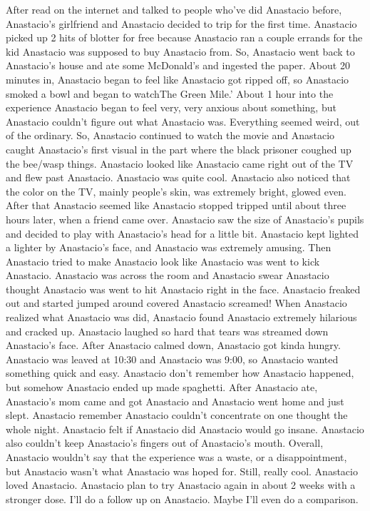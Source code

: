 \documentclass[12pt]{book}
\begin{document}
After read on the internet and talked to people who've did Anastacio before, Anastacio's girlfriend and Anastacio decided to trip for the first time. Anastacio picked up 2 hits of blotter for free because Anastacio ran a couple errands for the kid Anastacio was supposed to buy Anastacio from. So, Anastacio went back to Anastacio's house and ate some McDonald's and ingested the paper. About 20 minutes in, Anastacio began to feel like Anastacio got ripped off, so Anastacio smoked a bowl and began to watchThe Green Mile.' About 1 hour into the experience Anastacio began to feel very, very anxious about something, but Anastacio couldn't figure out what Anastacio was. Everything seemed weird, out of the ordinary. So, Anastacio continued to watch the movie and Anastacio caught Anastacio's first visual in the part where the black prisoner coughed up the bee/wasp things. Anastacio looked like Anastacio came right out of the TV and flew past Anastacio. Anastacio was quite cool. Anastacio also noticed that the color on the TV, mainly people's skin, was extremely bright, glowed even. After that Anastacio seemed like Anastacio stopped tripped until about three hours later, when a friend came over. Anastacio saw the size of Anastacio's pupils and decided to play with Anastacio's head for a little bit. Anastacio kept lighted a lighter by Anastacio's face, and Anastacio was extremely amusing. Then Anastacio tried to make Anastacio look like Anastacio was went to kick Anastacio. Anastacio was across the room and Anastacio swear Anastacio thought Anastacio was went to hit Anastacio right in the face. Anastacio freaked out and started jumped around covered Anastacio screamed! When Anastacio realized what Anastacio was did, Anastacio found Anastacio extremely hilarious and cracked up. Anastacio laughed so hard that tears was streamed down Anastacio's face. After Anastacio calmed down, Anastacio got kinda hungry. Anastacio was leaved at 10:30 and Anastacio was 9:00, so Anastacio wanted something quick and easy. Anastacio don't remember how Anastacio happened, but somehow Anastacio ended up made spaghetti. After Anastacio ate, Anastacio's mom came and got Anastacio and Anastacio went home and just slept. Anastacio remember Anastacio couldn't concentrate on one thought the whole night. Anastacio felt if Anastacio did Anastacio would go insane. Anastacio also couldn't keep Anastacio's fingers out of Anastacio's mouth. Overall, Anastacio wouldn't say that the experience was a waste, or a disappointment, but Anastacio wasn't what Anastacio was hoped for. Still, really cool. Anastacio loved Anastacio. Anastacio plan to try Anastacio again in about 2 weeks with a stronger dose. I'll do a follow up on Anastacio. Maybe I'll even do a comparison.
\end{document}
